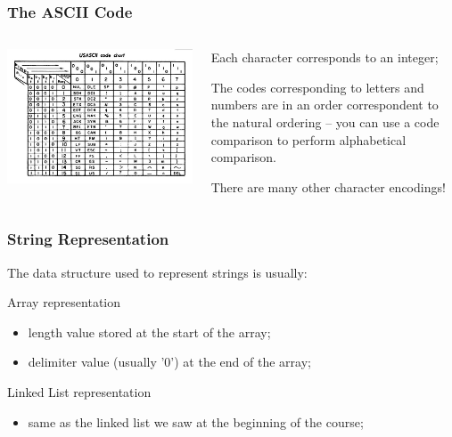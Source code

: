 \begin{frame}
  \frametitle{The ASCII Code}
  \begin{columns}[c]
    \includegraphics[width=1\textwidth]{img/ASCIItableOld}
    \begin{itemize}
      {\small
    \item Each character corresponds to an integer;
    \item The codes corresponding to letters and numbers are in an
      order correspondent to the natural ordering -- you can use a
      code comparison to perform alphabetical comparison.  
    \item There are many other character encodings!
      }
    \end{itemize}
  \end{columns}
\end{frame}

\begin{frame}
  \frametitle{String Representation}
  \begin{center}
    The data structure used to represent strings is usually:
  \end{center}
  \begin{block}{Array representation}
    \begin{itemize}
    \item length value stored at the start of the array;
    \item delimiter value (usually '0') at the end of the array;
    \end{itemize}
  \end{block}
  \begin{block}{Linked List representation}
    \begin{itemize}
    \item same as the linked list we saw at the beginning of the course;
    \end{itemize}
  \end{block}
\end{frame}

